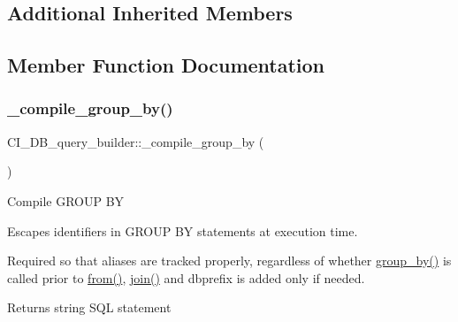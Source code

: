 \subsection*{Additional Inherited Members}


\subsection{Member Function Documentation}
\mbox{\label{class_c_i___d_b__query__builder_ae5bab30c9e567c01524e66ec3b20360c}} 
\subsubsection{\texorpdfstring{\+\_\+compile\+\_\+group\+\_\+by()}{\_compile\_group\_by()}}
{\footnotesize\ttfamily C\+I\+\_\+\+D\+B\+\_\+query\+\_\+builder\+::\+\_\+compile\+\_\+group\+\_\+by (\begin{DoxyParamCaption}{ }\end{DoxyParamCaption})\hspace{0.3cm}{\ttfamily [protected]}}

Compile G\+R\+O\+UP BY

Escapes identifiers in G\+R\+O\+UP BY statements at execution time.

Required so that aliases are tracked properly, regardless of whether \mbox{\hyperlink{class_c_i___d_b__query__builder_ad56fca465b77d095482c454d10700bf3}{group\+\_\+by()}} is called prior to \mbox{\hyperlink{class_c_i___d_b__query__builder_a69d7cedff660dbe0dedbef5562eacefb}{from()}}, \mbox{\hyperlink{class_c_i___d_b__query__builder_a9724fb9cda09e5318fd43fff95df455a}{join()}} and dbprefix is added only if needed.

\begin{DoxyReturn}{Returns}
string S\+QL statement 
\end{DoxyReturn}
\mbox{\label{class_c_i___d_b__query__builder_a93497f72c441881a767099ef74f2a2bf}} 
